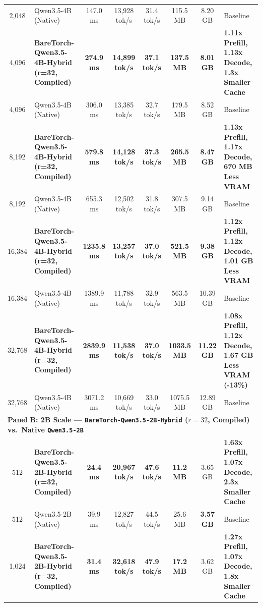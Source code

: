 \documentclass[twocolumn,10pt]{article}
\begin{document}
\begin{table}[!htbp]
{\begin{tabular}{clcccccl}
2,048 & Qwen3.5-4B (Native) & 147.0 ms & 13,928 tok/s & 31.4 tok/s & 115.5 MB & 8.20 GB & Baseline \\
4,096 & \textbf{BareTorch-Qwen3.5-4B-Hybrid (r=32, Compiled)} & \textbf{274.9 ms} & \textbf{14,899 tok/s} & \textbf{37.1 tok/s} & \textbf{137.5 MB} & \textbf{8.01 GB} & \textbf{1.11x Prefill, 1.13x Decode, 1.3x Smaller Cache} \\
4,096 & Qwen3.5-4B (Native) & 306.0 ms & 13,385 tok/s & 32.7 tok/s & 179.5 MB & 8.52 GB & Baseline \\
8,192 & \textbf{BareTorch-Qwen3.5-4B-Hybrid (r=32, Compiled)} & \textbf{579.8 ms} & \textbf{14,128 tok/s} & \textbf{37.3 tok/s} & \textbf{265.5 MB} & \textbf{8.47 GB} & \textbf{1.13x Prefill, 1.17x Decode, 670 MB Less VRAM} \\
8,192 & Qwen3.5-4B (Native) & 655.3 ms & 12,502 tok/s & 31.8 tok/s & 307.5 MB & 9.14 GB & Baseline \\
16,384 & \textbf{BareTorch-Qwen3.5-4B-Hybrid (r=32, Compiled)} & \textbf{1235.8 ms} & \textbf{13,257 tok/s} & \textbf{37.0 tok/s} & \textbf{521.5 MB} & \textbf{9.38 GB} & \textbf{1.12x Prefill, 1.12x Decode, 1.01 GB Less VRAM} \\
16,384 & Qwen3.5-4B (Native) & 1389.9 ms & 11,788 tok/s & 32.9 tok/s & 563.5 MB & 10.39 GB & Baseline \\
32,768 & \textbf{BareTorch-Qwen3.5-4B-Hybrid (r=32, Compiled)} & \textbf{2839.9 ms} & \textbf{11,538 tok/s} & \textbf{37.0 tok/s} & \textbf{1033.5 MB} & \textbf{11.22 GB} & \textbf{1.08x Prefill, 1.12x Decode, 1.67 GB Less VRAM (-13\%)} \\
32,768 & Qwen3.5-4B (Native) & 3071.2 ms & 10,669 tok/s & 33.0 tok/s & 1075.5 MB & 12.89 GB & Baseline \\
\midrule
\multicolumn{8}{l}{\textbf{Panel B: 2B Scale --- \texttt{BareTorch-Qwen3.5-2B-Hybrid} ($r=32$, Compiled) vs.\ Native \texttt{Qwen3.5-2B}}} \\
512 & \textbf{BareTorch-Qwen3.5-2B-Hybrid (r=32, Compiled)} & \textbf{24.4 ms} & \textbf{20,967 tok/s} & \textbf{47.6 tok/s} & \textbf{11.2 MB} & 3.65 GB & \textbf{1.63x Prefill, 1.07x Decode, 2.3x Smaller Cache} \\
512 & Qwen3.5-2B (Native) & 39.9 ms & 12,827 tok/s & 44.5 tok/s & 25.6 MB & \textbf{3.57 GB} & Baseline \\
1,024 & \textbf{BareTorch-Qwen3.5-2B-Hybrid (r=32, Compiled)} & \textbf{31.4 ms} & \textbf{32,618 tok/s} & \textbf{47.9 tok/s} & \textbf{17.2 MB} & 3.62 GB & \textbf{1.27x Prefill, 1.07x Decode, 1.8x Smaller Cache} \\

\end{tabular}}
\end{table}
\end{document}
